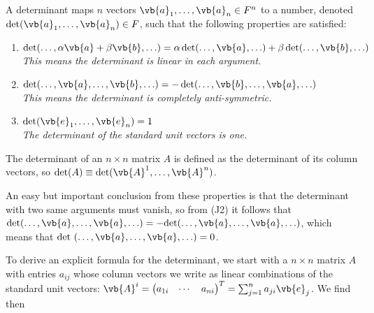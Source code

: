 \documentclass[a4paper,12pt]{report}
\begin{document}
\begin{definition}
    A determinant maps \( n \) vectors \(\vb{a}_1, \ldots, \vb{a}_n \in F^n\) to a number, denoted \(\det(\vb{a}_1, \ldots, \vb{a}_n) \in F\), such that the following properties are satisfied:
    \begin{enumerate}[label=(\(J\)\arabic*)]
        \item \(\det(\ldots, \alpha \vb{a} + \beta \vb{b}, \ldots) = \alpha \det(\ldots, \vb{a}, \ldots) + \beta \det(\ldots, \vb{b}, \ldots)\)\\
        \textit{This means the determinant is linear in each argument.}
        
        \item \(\det(\ldots, \vb{a}, \ldots, \vb{b}, \ldots) = -\det(\ldots, \vb{b}, \ldots, \vb{a}, \ldots)\)\\
        \textit{This means the determinant is completely anti-symmetric.}
        
        \item \(\det(\vb{e}_1, \ldots, \vb{e}_n) = 1\)\\
        \textit{The determinant of the standard unit vectors is one.}
    \end{enumerate}
    The determinant of an \( n \times n \) matrix \( A \) is defined as the determinant of its column vectors, so \(\det(A) \equiv  \det(\vb{A}^1, \ldots, \vb{A}^n)\).
\end{definition}

An easy but important conclusion from these properties is that the determinant with two same arguments must vanish, so from (J2) it follows that \(\text{det}(\ldots , \vb{a} , \ldots , \vb{a} , \ldots ) = - \text{det}(\ldots ,\vb{a} ,\ldots ,\vb{a} ,\ldots )  \), which means that \(\text{det }(\ldots , \vb{a} ,\ldots ,\vb{a} ,\ldots ) = 0  \). 

To derive an explicit formula for the determinant, we start with a \(n \times n\) matrix \(A\) with entries \(a_{ij} \) whose column vectors we write as linear combinations of the standard unit vectors: \(\vb{A} ^{i} = \begin{pmatrix}
         a_{1i}  &
         \cdots  &
         a_{ni} 
    \end{pmatrix}^T = \sum_{j=1}^{n} a_{ji} \vb{e} _{j}\). We find then
\end{document}
